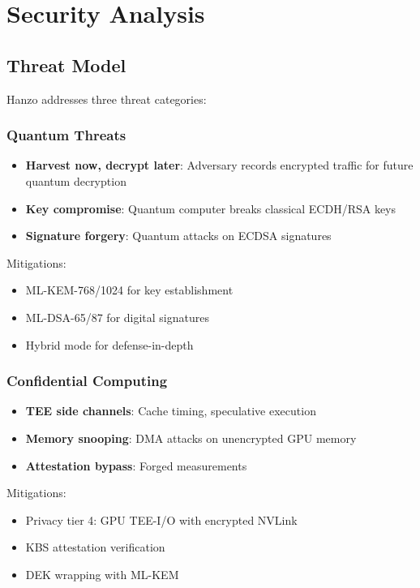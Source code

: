 \section{Security Analysis}


\subsection{Threat Model}

Hanzo addresses three threat categories:

\subsubsection{Quantum Threats}

\begin{itemize}
\item \textbf{Harvest now, decrypt later}: Adversary records encrypted traffic for future quantum decryption
\item \textbf{Key compromise}: Quantum computer breaks classical ECDH/RSA keys
\item \textbf{Signature forgery}: Quantum attacks on ECDSA signatures
\end{itemize}

Mitigations:
\begin{itemize}
\item ML-KEM-768/1024 for key establishment
\item ML-DSA-65/87 for digital signatures
\item Hybrid mode for defense-in-depth
\end{itemize}

\subsubsection{Confidential Computing}

\begin{itemize}
\item \textbf{TEE side channels}: Cache timing, speculative execution
\item \textbf{Memory snooping}: DMA attacks on unencrypted GPU memory
\item \textbf{Attestation bypass}: Forged measurements
\end{itemize}

Mitigations:
\begin{itemize}
\item Privacy tier 4: GPU TEE-I/O with encrypted NVLink
\item KBS attestation verification
\item DEK wrapping with ML-KEM
\end{itemize}

